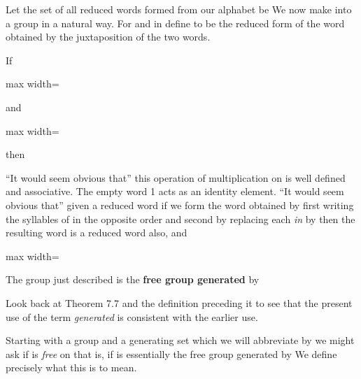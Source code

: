 \documentclass[11pt,oneside]{article}
\begin{document}
\begin{BookBody}

\noindent Let the set of all reduced words formed from our alphabet  be  We now make  into a group in a natural way. For  and  in  define  to be the reduced form of the word obtained by the juxtaposition  of the two words.

 If

\begin{center}\begin{adjustbox}{max width=\linewidth}\end{adjustbox}\end{center}

\noindent and

\begin{center}\begin{adjustbox}{max width=\linewidth}\end{adjustbox}\end{center}

\noindent then  \BookEnd{\blacktriangle}

“It would seem obvious that” this operation of multiplication on  is well defined and associative. The empty word 1 acts as an identity element. “It would seem obvious that” given a reduced word  if we form the word obtained by first writing the syllables of  in the opposite order and second by replacing each \textit{in} by  then the resulting word  is a reduced word also, and

\begin{center}\begin{adjustbox}{max width=\linewidth}\end{adjustbox}\end{center}

 The group  just described is the\textbf{ free group generated} by  \BookEnd{\blacksquare}

Look back at Theorem 7.7 and the definition preceding it to see that the present use of the term\textit{ generated} is consistent with the earlier use.

Starting with a group  and a generating set  which we will abbreviate by  we might ask if  is\textit{ free} on  that is, if  is essentially the free group generated by  We define precisely what this is to mean.

\end{BookBody}
\end{document}
